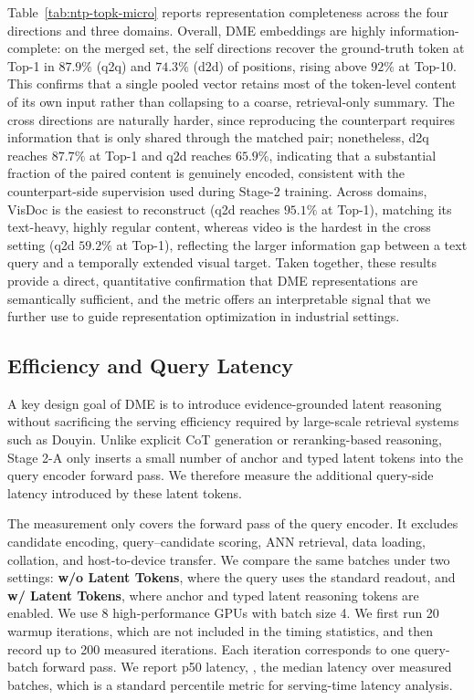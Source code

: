 Table~\ref{tab:ntp-topk-micro} reports representation completeness across the
four directions and three domains. Overall, DME embeddings are highly
information-complete: on the merged set, the self directions recover the
ground-truth token at Top-1 in $87.9\%$ (q2q) and $74.3\%$ (d2d) of positions,
rising above $92\%$ at Top-10. This confirms that a single pooled vector
retains most of the token-level content of its own input rather than collapsing
to a coarse, retrieval-only summary. The cross directions are naturally harder,
since reproducing the counterpart requires information that is only shared
through the matched pair; nonetheless, d2q reaches $87.7\%$ at Top-1 and q2d
reaches $65.9\%$, indicating that a substantial fraction of the paired content
is genuinely encoded, consistent with the counterpart-side supervision used
during Stage-2 training. Across domains, VisDoc is the easiest to reconstruct
(q2d reaches $95.1\%$ at Top-1), matching its text-heavy, highly regular
content, whereas video is the hardest in the cross setting (q2d $59.2\%$ at
Top-1), reflecting the larger information gap between a text query and a
temporally extended visual target. Taken together, these results provide a
direct, quantitative confirmation that DME representations are semantically
sufficient, and the metric offers an interpretable signal that we further use
to guide representation optimization in industrial settings.


\subsection{Efficiency and Query Latency}
\label{sec:efficiency-query-latency}

A key design goal of DME is to introduce evidence-grounded latent reasoning without sacrificing the serving efficiency required by large-scale retrieval systems such as Douyin. Unlike explicit CoT generation or reranking-based reasoning, Stage 2-A only inserts a small number of anchor and typed latent tokens into the query encoder forward pass. We therefore measure the additional query-side latency introduced by these latent tokens.

The measurement only covers the forward pass of the query encoder. It excludes candidate encoding, query--candidate scoring, ANN retrieval, data loading, collation, and host-to-device transfer. 
We compare the same batches under two settings: \textbf{w/o Latent Tokens}, where the query uses the standard readout, and \textbf{w/ Latent Tokens}, where anchor and typed latent reasoning tokens are enabled. We use 8 high-performance GPUs with batch size 4. We first run 20 warmup iterations, which are not included in the timing statistics, and then record up to 200 measured iterations. Each iteration corresponds to one query-batch forward pass. We report p50 latency, \ie, the median latency over measured batches, which is a standard percentile metric for serving-time latency analysis.

